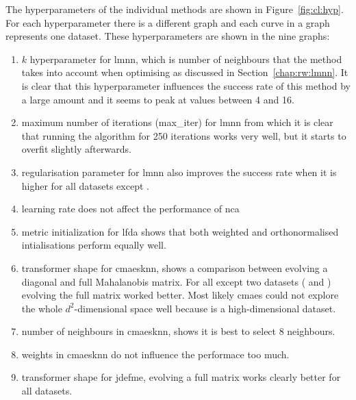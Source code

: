 \documentclass[12pt,a4paper]{report}
\begin{document}

\clearpage

The hyperparameters of the individual methods are shown in Figure~\ref{fig:cl:hyp}. For each hyperparameter there is a different graph and each curve in a graph represents one dataset. These hyperparameters are shown in the nine graphs:

\begin{enumerate}
\item $k$ hyperparameter for \ac{lmnn}, which is number of neighbours that the method takes into account when optimising as discussed in Section~\ref{chap:rw:lmnn}. It is clear that this hyperparameter influences the success rate of this method by a large amount and it seems to peak at values between 4 and 16.

\item maximum number of iterations (max\_iter) for \ac{lmnn} from which it is clear that running the algorithm for 250 iterations works very well, but it starts to overfit slightly afterwards.

\item regularisation parameter for \ac{lmnn} also improves the success rate when it is higher for all datasets except .

\item learning rate does not affect the performance of \ac{nca}

\item metric initialization for \ac{lfda} shows that both weighted and orthonormalised intialisations perform equally well.

\item transformer shape for \ac{cmaesknn}, shows a comparison between evolving a diagonal and full Mahalanobis matrix. For all except two datasets ( and ) evolving the full matrix worked better. Most likely \ac{cmaes} could not explore the whole $d^2$-dimensional space well because  is a high-dimensional dataset.

\item number of neighbours in \ac{cmaesknn}, shows it is best to select 8 neighbours.

\item weights in \ac{cmaesknn} do not influence the performace too much.

\item transformer shape for \ac{jdefme}, evolving a full matrix works clearly better for all datasets.
\end{enumerate}
\end{document}

